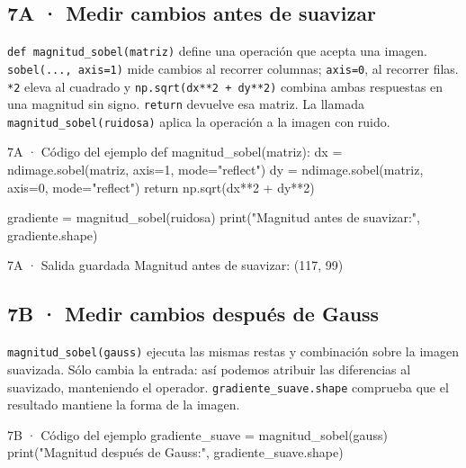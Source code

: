 
\subsection*{7A · Medir cambios antes de suavizar}

\label{vivo:7a}

\texttt{\small def magnitud\_sobel(\allowbreak{}matriz)\allowbreak{}} define una operación que acepta una imagen. \texttt{\small sobel(\allowbreak{}.\allowbreak{}.\allowbreak{}.\allowbreak{},\allowbreak{} axis=1)\allowbreak{}} mide cambios al recorrer columnas; \texttt{\small axis=0}, al recorrer filas. \texttt{\small **2} eleva al cuadrado y \texttt{\small np.\allowbreak{}sqrt(\allowbreak{}dx**2 + dy**2)\allowbreak{}} combina ambas respuestas en una magnitud sin signo. \texttt{\small return} devuelve esa matriz. La llamada \texttt{\small magnitud\_sobel(\allowbreak{}ruidosa)\allowbreak{}} aplica la operación a la imagen con ruido.

\begin{CodigoVivo}{7A · Código del ejemplo}
def magnitud_sobel(matriz):
    dx = ndimage.sobel(matriz, axis=1, mode="reflect")
    dy = ndimage.sobel(matriz, axis=0, mode="reflect")
    return np.sqrt(dx**2 + dy**2)

gradiente = magnitud_sobel(ruidosa)
print("Magnitud antes de suavizar:", gradiente.shape)
\end{CodigoVivo}


\begin{Salida}{7A · Salida guardada}
Magnitud antes de suavizar: (117, 99)
\end{Salida}



\subsection*{7B · Medir cambios después de Gauss}

\label{vivo:7b}

\texttt{\small magnitud\_sobel(\allowbreak{}gauss)\allowbreak{}} ejecuta las mismas restas y combinación sobre la imagen suavizada. Sólo cambia la entrada: así podemos atribuir las diferencias al suavizado, manteniendo el operador. \texttt{\small gradiente\_suave.\allowbreak{}shape} comprueba que el resultado mantiene la forma de la imagen.

\begin{CodigoVivo}{7B · Código del ejemplo}
gradiente_suave = magnitud_sobel(gauss)
print("Magnitud después de Gauss:", gradiente_suave.shape)
\end{CodigoVivo}


